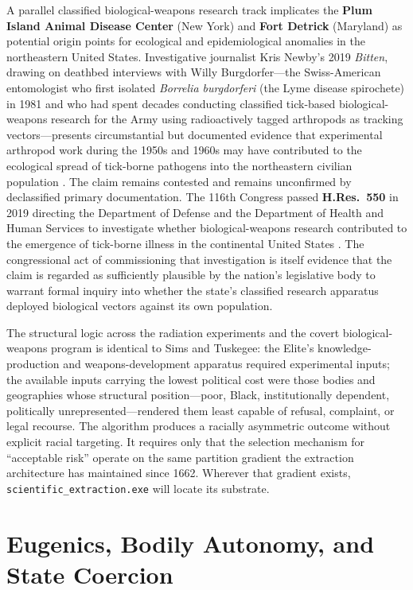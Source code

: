 A parallel classified biological-weapons research track implicates the \textbf{Plum Island Animal Disease Center} (New York) and \textbf{Fort Detrick} (Maryland) as potential origin points for ecological and epidemiological anomalies in the northeastern United States. Investigative journalist Kris Newby's 2019 \textit{Bitten}, drawing on deathbed interviews with Willy Burgdorfer---the Swiss-American entomologist who first isolated \textit{Borrelia burgdorferi} (the Lyme disease spirochete) in 1981 and who had spent decades conducting classified tick-based biological-weapons research for the Army using radioactively tagged arthropods as tracking vectors---presents circumstantial but documented evidence that experimental arthropod work during the 1950s and 1960s may have contributed to the ecological spread of tick-borne pathogens into the northeastern civilian population \cite{newby_bitten}. The claim remains contested and remains unconfirmed by declassified primary documentation. The 116th Congress passed \textbf{H.Res.~550} in 2019 directing the Department of Defense and the Department of Health and Human Services to investigate whether biological-weapons research contributed to the emergence of tick-borne illness in the continental United States \cite{hres550}. The congressional act of commissioning that investigation is itself evidence that the claim is regarded as sufficiently plausible by the nation's legislative body to warrant formal inquiry into whether the state's classified research apparatus deployed biological vectors against its own population.

The structural logic across the radiation experiments and the covert biological-weapons program is identical to Sims and Tuskegee: the Elite's knowledge-production and weapons-development apparatus required experimental inputs; the available inputs carrying the lowest political cost were those bodies and geographies whose structural position---poor, Black, institutionally dependent, politically unrepresented---rendered them least capable of refusal, complaint, or legal recourse. The algorithm produces a racially asymmetric outcome without explicit racial targeting. It requires only that the selection mechanism for ``acceptable risk'' operate on the same partition gradient the extraction architecture has maintained since 1662. Wherever that gradient exists, \texttt{scientific\_extraction.exe} will locate its substrate.

\section{Eugenics, Bodily Autonomy, and State Coercion}

